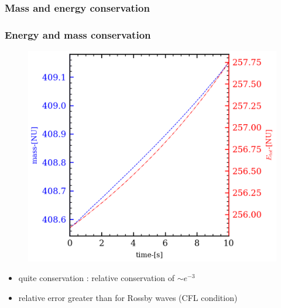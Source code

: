 \documentclass[numbering=fraction]{beamer}
\begin{document}
\subsubsection{Mass and energy conservation}
\begin{frame}
    \frametitle{Energy and mass conservation}
    \begin{minipage}{.7\linewidth}
        \begin{figure}[H]
            \centering
            \includegraphics[width=\linewidth]{./figure/energy_kelvin_wave.png}
        \end{figure}
    \end{minipage}
    \begin{minipage}{.28\linewidth}
        \begin{itemize}
            \item quite conservation : relative conservation of $\sim e^{-3}$
            \item relative error greater than for Rossby waves (CFL condition)
        \end{itemize}
    \end{minipage}
\end{frame}
\end{document}
